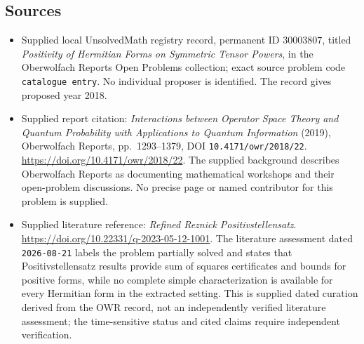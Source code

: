 \documentclass[11pt]{article}
\begin{document}
\subsection{Sources}
\begin{itemize}
\item Supplied local UnsolvedMath registry record, permanent ID \(30003807\), titled \emph{Positivity of Hermitian Forms on Symmetric Tensor Powers}, in the Oberwolfach Reports Open Problems collection; exact source problem code \texttt{catalogue entry}. No individual proposer is identified. The record gives proposed year 2018.
\item Supplied report citation: \emph{Interactions between Operator Space Theory and Quantum Probability with Applications to Quantum Information} (2019), Oberwolfach Reports, pp.\ 1293--1379, DOI \texttt{10.4171/owr/2018/22}. \url{https://doi.org/10.4171/owr/2018/22}. The supplied background describes Oberwolfach Reports as documenting mathematical workshops and their open-problem discussions. No precise page or named contributor for this problem is supplied.
\item Supplied literature reference: \emph{Refined Reznick Positivstellensatz}. \url{https://doi.org/10.22331/q-2023-05-12-1001}. The literature assessment dated \texttt{2026-08-21} labels the problem partially solved and states that Positivstellensatz results provide sum of squares certificates and bounds for positive forms, while no complete simple characterization is available for every Hermitian form in the extracted setting. This is supplied dated curation derived from the OWR record, not an independently verified literature assessment; the time-sensitive status and cited claims require independent verification.
\end{itemize}
\end{document}
